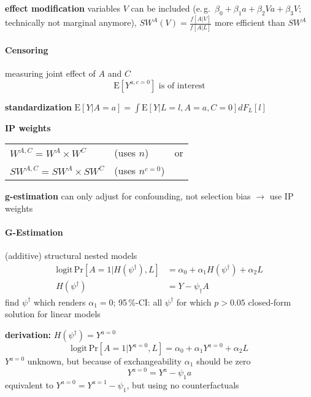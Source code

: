 \documentclass[8pt]{extarticle}
\begin{document}
\begin{multicols}{2}
\noindent \textbf{effect modification} variables $V$ can be included (e.\,g.\ $\beta_0+\beta_1 a+\beta_2 V a + \beta_3 V$; technically not marginal anymore), $SW^A(V) = \frac{f\left[A|V\right]}{f\left[A|L\right]}$ more efficient than $SW^A$
 

\paragraph{\large Censoring} measuring joint effect of $A$ and $C$
$$\mathrm{E}\left[Y^{a, c=0}\right] \text{ is of interest}$$

\noindent \textbf{standardization} $\mathrm{E}\left[Y|A=a\right] = \int \mathrm{E}\left[Y|L{=}l, A{=}a, C{=}0\right]dF_L\left[l\right]$\vspace{0.2em}

\noindent \textbf{IP weights}\vspace{-1.30em}

\hspace{3.5em}\begin{tabular}{l l l}
$W^{A,C}=W^A \times W^C$  &(uses $n$) & or \\
$SW^{A,C}=SW^A \times SW^C$ &(uses $n^{c=0}$) & 
\end{tabular}\vspace{0.3em}

\noindent \textbf{g-estimation} can only adjust for confounding, not selection bias $\rightarrow$ use IP weights






\paragraph{\large G-Estimation} (additive) structural nested models %
\begin{align*}
\mathrm{logit} \, \mathrm{Pr}\left[A=1|H(\psi^\dagger), L\right] &= \alpha_0 + \alpha_1H(\psi^\dagger) + \alpha_2L \\
H(\psi^\dagger) &= Y - \psi_\dagger A
\end{align*}
find $\psi^\dagger$ which renders $\alpha_1=0$; 95\,\%-CI: all $\psi^\dagger$ for which $p>0.05$
closed-form solution for linear models


\noindent \textbf{derivation:} $H(\psi^\dagger) = Y^{a=0}$
$$\mathrm{logit} \, \mathrm{Pr}\left[A=1|Y^{a=0}, L\right] = \alpha_0 + \alpha_1Y^{a=0} + \alpha_2L$$
$Y^{a=0}$ unknown, but because of exchangeability $\alpha_1$ should be zero
$$Y^{a=0} =Y^a - \psi_1 a$$
equivalent to $Y^{a=0} =Y^{a=1} - \psi_1$, but using no counterfactuals




\end{multicols}
\end{document}
